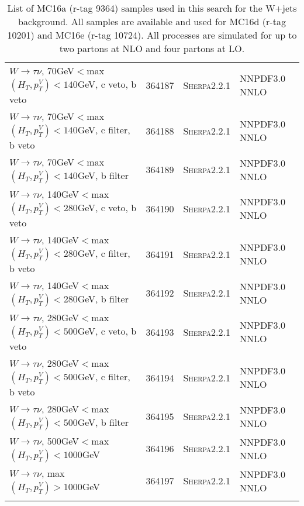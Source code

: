 \begin{table}[h!]
\begin{center}
{\begin{tabular}{@{} lcll @{}}
$W\rightarrow \tau\nu$, 70GeV$<$max$(H_T,p_T^V)<140$GeV, c veto, b veto & 364187& \textsc{Sherpa2.2.1} &NNPDF3.0 NNLO \\
$W\rightarrow \tau\nu$, 70GeV$<$max$(H_T,p_T^V)<140$GeV, c filter, b veto & 364188& \textsc{Sherpa2.2.1} &NNPDF3.0 NNLO \\
$W\rightarrow \tau\nu$, 70GeV$<$max$(H_T,p_T^V)<140$GeV, b filter & 364189& \textsc{Sherpa2.2.1} &NNPDF3.0 NNLO \\
$W\rightarrow \tau\nu$, 140GeV$<$max$(H_T,p_T^V)<280$GeV, c veto, b veto & 364190&  \textsc{Sherpa2.2.1} &NNPDF3.0 NNLO \\
$W\rightarrow \tau\nu$, 140GeV$<$max$(H_T,p_T^V)<280$GeV, c filter, b veto & 364191& \textsc{Sherpa2.2.1} &NNPDF3.0 NNLO \\
$W\rightarrow \tau\nu$, 140GeV$<$max$(H_T,p_T^V)<280$GeV, b filter & 364192& \textsc{Sherpa2.2.1} &NNPDF3.0 NNLO \\
$W\rightarrow \tau\nu$, 280GeV$<$max$(H_T,p_T^V)<500$GeV, c veto, b veto & 364193& \textsc{Sherpa2.2.1} &NNPDF3.0 NNLO \\
$W\rightarrow \tau\nu$, 280GeV$<$max$(H_T,p_T^V)<500$GeV, c filter, b veto & 364194& \textsc{Sherpa2.2.1} &NNPDF3.0 NNLO \\
$W\rightarrow \tau\nu$, 280GeV$<$max$(H_T,p_T^V)<500$GeV, b filter &  364195& \textsc{Sherpa2.2.1} &NNPDF3.0 NNLO \\
$W\rightarrow \tau\nu$, 500GeV$<$max$(H_T,p_T^V)<1000$GeV & 364196& \textsc{Sherpa2.2.1} &NNPDF3.0 NNLO \\
$W\rightarrow \tau\nu$, max$(H_T,p_T^V)>1000$GeV&  364197&		 \textsc{Sherpa2.2.1} &NNPDF3.0 NNLO \\
 \hhline{====}
\end{tabular}
\caption{List of MC16a (r-tag  9364) samples used in this search for the W+jets background.  All samples are available and used for MC16d (r-tag 10201) and MC16e (r-tag 10724). All processes are simulated for up to two partons at NLO and four partons at LO.}
\label{tab:MCSample3}
}
\end{center}
\end{table}



